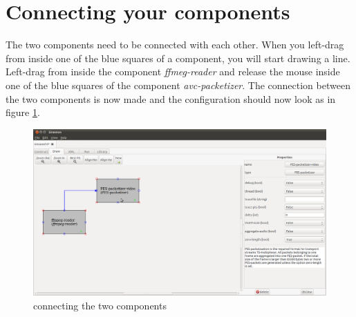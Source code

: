 \documentclass[12pt]{report}
\begin{document}
\section{Connecting your components}
The two components need to be connected with each other. When you left-drag from inside one of the blue squares of a component, you will start drawing a line. Left-drag from inside the component \textit{ffmeg-reader} and release the mouse inside one of the blue squares of the component \textit{avc-packetizer}. The connection between the two components is now made and the configuration should now look as in figure \ref{fig:10}.
\begin{center}
\begin{figure}[!ht]
	\includegraphics[width=1.0\textwidth]{./images/ui05.png}
	\caption{connecting the two components}
	\label{fig:10}
\end{figure}
\end{center}
\newpage
\end{document}
